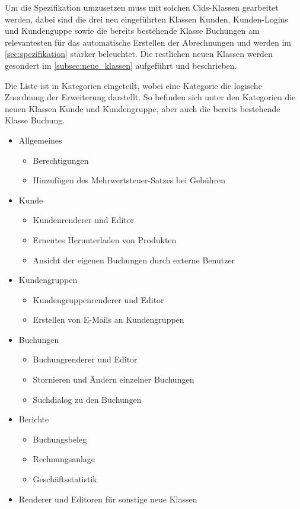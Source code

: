 Um die Spezifikation umzusetzen muss mit solchen Cids-Klassen gearbeitet werden, dabei sind die drei neu eingeführten Klassen Kunden, Kunden-Logins und Kundenguppe sowie die bereits bestehende Klasse Buchungen am relevantesten für das automatische Erstellen der Abrechnungen und werden im \autoref{sec:spezifikation} stärker beleuchtet. 
Die restlichen neuen Klassen werden gesondert im \autoref{subsec:neue_klassen} aufgeführt und beschrieben.

Die Liste ist in Kategorien eingeteilt, wobei eine Kategorie die logische Zuordnung der Erweiterung darstellt.
So befinden sich unter den Kategorien die neuen Klassen Kunde und Kundengruppe, aber auch die bereits bestehende Klasse Buchung. 
\begin{itemize}
	\item Allgemeines
	\begin{itemize}
		\item Berechtigungen
		\item Hinzufügen des Mehrwertsteuer-Satzes bei Gebühren
	\end{itemize}
	\item Kunde
	\begin{itemize}
		\item Kundenrenderer und Editor
		\item Erneutes Herunterladen von Produkten
		\item Ansicht der eigenen Buchungen durch externe Benutzer
	\end{itemize}
	\item Kundengruppen
	\begin{itemize}
		\item Kundengruppenrenderer und Editor
		\item Erstellen von E-Mails an Kundengruppen
	\end{itemize}
	\item Buchungen
	\begin{itemize}
		\item Buchungrenderer und Editor
		\item Stornieren und Ändern einzelner Buchungen
		\item Suchdialog zu den Buchungen
	\end{itemize}
	\item Berichte
	\begin{itemize}
		\item Buchungsbeleg
		\item Rechnungsanlage
		\item Geschäftsstatistik
	\end{itemize}	 
	\item Renderer und Editoren für sonstige neue Klassen
\end{itemize}

